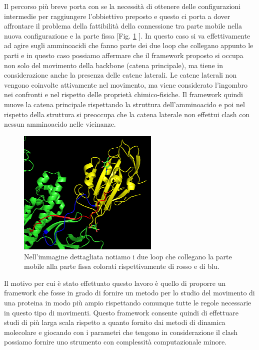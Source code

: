 Il percorso più breve porta con se la necessità di ottenere delle configurazioni intermedie per raggiungere l'obbiettivo preposto e questo ci porta a dover affrontare il problema della fattibilità della connessione tra parte mobile nella nuova configurazione e la parte fissa [Fig. \ref{fig:Dettaglio} ]. In questo caso si va effettivamente ad agire sugli amminoacidi che fanno parte dei due loop che collegano appunto le parti e in questo caso possiamo affermare che il framework proposto si occupa non solo del movimento della backbone (catena principale), ma tiene in considerazione anche la presenza delle catene laterali. Le catene laterali non vengono coinvolte attivamente nel movimento, ma viene considerato l'ingombro nei confronti e nel rispetto delle proprietà chimico-fisiche. Il framework quindi muove la catena principale rispettando la struttura dell'amminoacido e poi nel rispetto della struttura si preoccupa che la catena laterale non effettui clash con nessun amminoacido nelle vicinanze. 

\begin{figure}
	\centering
	\includegraphics[width=0.6\textwidth]{Immagini/Struttura_spike_dettaglio.png}
	\caption{Nell'immagine dettagliata notiamo i due loop che collegano la parte mobile alla parte fissa colorati rispettivamente di rosso e di blu.}
	\label{fig:Dettaglio}
\end{figure}

Il motivo per cui è stato effettuato questo lavoro è quello di proporre un framework che fosse in grado di fornire un metodo per lo studio del movimento di una proteina in modo più ampio rispettando comunque tutte le regole necessarie in questo tipo di movimenti. Questo framework consente quindi di effettuare studi di più larga scala rispetto a quanto fornito dai metodi di dinamica molecolare e giocando con i parametri che tengono in considerazione il clash possiamo fornire uno strumento con complessità computazionale minore. 

